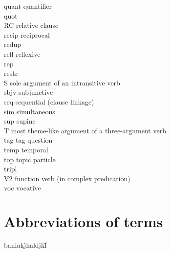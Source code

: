 \begin{refsection}
{\begin{tabbing}
{\sc quant} \> quantifier\\
{\sc quot} \> \\
{\sc RC} \> relative clause\\
{\sc recip} \> reciprocal\\
{\sc redup}\> \\
{\sc refl}\> reflexive\\
{\sc rep} \> \\
{\sc restr}\> \\
S 	\> sole argument of an intransitive verb\\
{\sc sbjv} \> subjunctive\\
{\sc seq}\> sequential (clause linkage)\\
{\sc sim} \> simultaneous\\
{\sc sup} \> supine\\
T \> most theme-like argument of a three-argument verb\\
{\sc tag} \> tag question\\
{\sc temp}\> temporal\\
{\sc top} \> topic particle\\
{\sc tripl}\> \\
{\sc V2}\> function verb (in complex predication)\\
{\sc voc}\> vocative\\
\end{tabbing}
}



\section*{Abbreviations of  terms}

 {\small
\begin{tabbing}
banlakjhaldjkf\= \kill 


\end{tabbing}}
\end{refsection}
